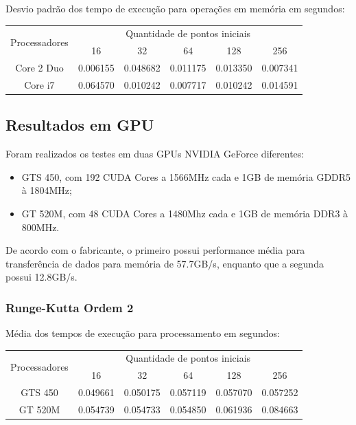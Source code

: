     \hspace{1mm}\newline
    
    \noindent Desvio padrão dos tempo de execução para operações em memória em segundos:\\
    \begin{tabular}{| c | c | c | c | c | c |}
      \hline
      \multirow{2}{*}{Processadores}& \multicolumn{5}{|c|}{Quantidade de pontos iniciais} \\ \cline{2-6}
      & 16 & 32 & 64 & 128 & 256 \\ \hline
      Core 2 Duo & 0.006155 & 0.048682 & 0.011175 & 0.013350 & 0.007341 \\ \hline
      Core i7 & 0.064570 & 0.010242 & 0.007717 & 0.010242 & 0.014591 \\ \hline

      \hline
    \end{tabular}

  \subsection{Resultados em GPU}
    Foram realizados os testes em duas GPUs NVIDIA GeForce diferentes:
  \begin{itemize}
    \item GTS 450, com 192 CUDA Cores a 1566MHz cada e 1GB de memória GDDR5 à 1804MHz;
    \item GT 520M, com 48 CUDA Cores a 1480Mhz cada e 1GB de memória DDR3 à 800MHz.
  \end{itemize}
  
  De acordo com o fabricante, o primeiro possui performance média para transferência de dados para memória de 57.7GB/s, enquanto que a segunda possui 12.8GB/s.
    \subsubsection{Runge-Kutta Ordem 2}
    Média dos tempos de execução para processamento em segundos:\\
    \begin{tabular}{| c | c | c | c | c | c |}
      \hline
      \multirow{2}{*}{Processadores}& \multicolumn{5}{|c|}{Quantidade de pontos iniciais} \\ \cline{2-6}
      & 16 & 32 & 64 & 128 & 256 \\ \hline
      GTS 450 & 0.049661 & 0.050175 & 0.057119 & 0.057070 & 0.057252 \\ \hline
      GT 520M & 0.054739 & 0.054733 & 0.054850 & 0.061936 & 0.084663 \\ \hline

      \hline
    \end{tabular}
    
